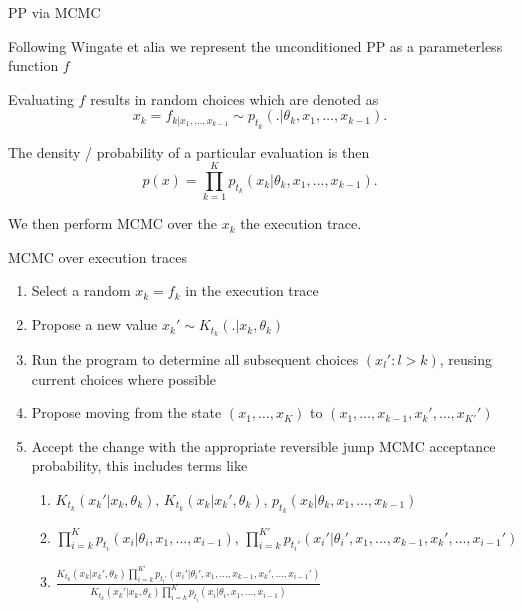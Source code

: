 \begin{frame}{PP via MCMC}
  \begin{block}{}
    Following Wingate et alia we represent the unconditioned PP as a parameterless function $f$
    \newline
    
    Evaluating $f$ results in random choices which are denoted as
    \begin{equation*}
      x_k = f_{k|x_1,\ldots,x_{k-1}} \sim p_{t_k}(.|\theta_{k},x_1,\ldots,x_{k-1}).
    \end{equation*}
    
    The density / probability of a particular evaluation is then
    \begin{equation*}
      p(x) = \prod_{k=1}^K p_{t_k}(x_k|\theta_{k},x_1,\ldots,x_{k-1}).
    \end{equation*}
    
    We then perform MCMC over the $x_k$ \ie the execution trace.
    
  \end{block}
\end{frame}

\begin{frame}{MCMC over execution traces}
  \begin{enumerate}
    \item Select a random $x_k = f_k$ in the execution trace
    \item Propose a new value $x_k' \sim K_{t_k}(.|x_k,\theta_k)$
    \item Run the program to determine all subsequent choices $(x_l' : l > k)$, reusing current choices where possible
    \item Propose moving from the state $(x_1,\ldots,x_K)$ to $(x_1,\ldots,x_{k-1},x_k',\ldots,x_{K'}')$
    \item Accept the change with the appropriate reversible jump MCMC acceptance probability, this includes terms like
    \begin{enumerate}
      \item $K_{t_k}(x_k'|x_k,\theta_k),\,K_{t_k}(x_k|x_k',\theta_k),\,p_{t_k}(x_k|\theta_{k},x_1,\ldots,x_{k-1})$
      \item $\prod_{i=k}^K p_{t_i}(x_i|\theta_{i},x_1,\ldots,x_{i-1}),\,\prod_{i=k}^{K'} p_{t_i'}(x_i'|\theta_{i}',x_1,\ldots,x_{k-1},x_k',\ldots,x_{i-1}')$
      \item \ie $\frac{K_{t_k}(x_k|x_k',\theta_k)\prod_{i=k}^{K'} p_{t_i'}(x_i'|\theta_{i}',x_1,\ldots,x_{k-1},x_k',\ldots,x_{i-1}')}{K_{t_k}(x_k'|x_k,\theta_k)\prod_{i=k}^K p_{t_i}(x_i|\theta_{i},x_1,\ldots,x_{i-1})}$
    \end{enumerate}
  \end{enumerate}
\end{frame}


